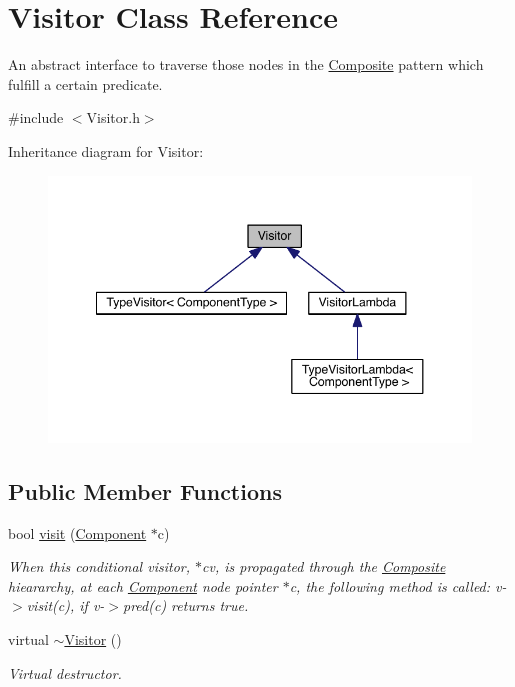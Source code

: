 \hypertarget{classVisitor}{\section{Visitor Class Reference}
\label{classVisitor}
}


An abstract interface to traverse those nodes in the \hyperlink{classComposite}{Composite} pattern which fulfill a certain predicate.  




{\ttfamily \#include $<$Visitor.\+h$>$}



Inheritance diagram for Visitor\+:\nopagebreak
\begin{figure}[H]
\begin{center}
\leavevmode
\includegraphics[width=348pt]{classVisitor__inherit__graph}
\end{center}
\end{figure}
\subsection*{Public Member Functions}
\begin{DoxyCompactItemize}
\item 
bool \hyperlink{classVisitor_a3f8ea7ad6aa61e99d8d1bc0576bdf23c}{visit} (\hyperlink{classComponent}{Component} $\ast$c)
\begin{DoxyCompactList}\small\item\em When this conditional visitor, $\ast$cv, is propagated through the \hyperlink{classComposite}{Composite} hieararchy, at each \hyperlink{classComponent}{Component} node pointer $\ast$c, the following method is called\+: v-\/$>$visit(c), if v-\/$>$pred(c) returns true. \end{DoxyCompactList}\item 
virtual \hyperlink{classVisitor_a2c9cc57ee3a518a193ea88384cbf3937}{$\sim$\+Visitor} ()
\begin{DoxyCompactList}\small\item\em Virtual destructor. \end{DoxyCompactList}\end{DoxyCompactItemize}
